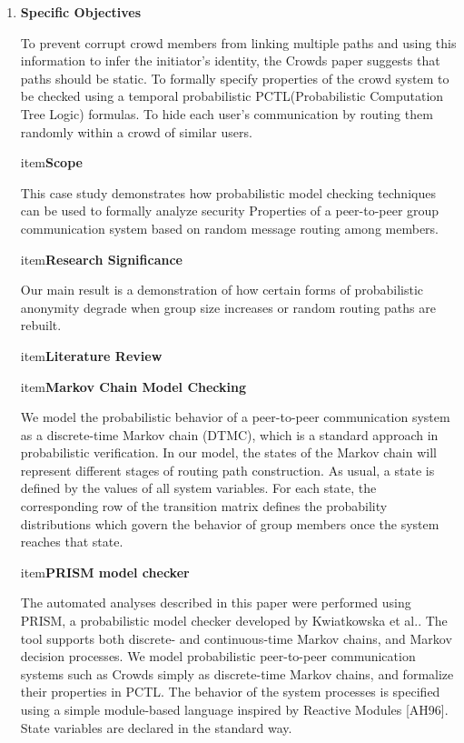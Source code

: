 \documentclass[10pt]{article}
\begin{document}
\begin{enumerate}
	\item\textbf{{\large Specific Objectives}}
	{\raggedright
	{\large To prevent corrupt crowd members from linking multiple paths and using this information to infer the initiator’s identity, the Crowds paper suggests that paths should be static.
To formally specify properties of the crowd system to be checked using a temporal probabilistic PCTL(Probabilistic Computation Tree Logic) formulas.
To hide each user’s communication by routing them randomly within a crowd of similar users.}
}
\begin{enumerate}
	item\textbf{{\large Scope}}
\end {enumerate}
	{\raggedright
{\large This case study demonstrates how probabilistic model checking techniques can be used to formally analyze security
Properties of a peer-to-peer group communication system based on random message routing among members.
 }
}
\begin{enumerate}
	item\textbf{{\large Research Significance}}
	\end {enumerate}
		{\raggedright
	{\large Our main result is a demonstration of how certain forms of probabilistic anonymity degrade when group size increases or random routing paths are rebuilt.}
}
\begin{enumarate}
item\textbf{{\large Literature Review}}
\end{enumarate}
\begin{enumarate}
item\textbf{{\large Markov Chain Model Checking}}
\end{enumarate}
{\raggedright
{\large We model the probabilistic behavior of a peer-to-peer communication system as a discrete-time Markov chain (DTMC), which is a standard approach in probabilistic verification. In our model, the states of the Markov chain will represent different stages of routing path construction. As usual, a state is defined by the values of all system variables. For each state, the corresponding row of the transition matrix defines the probability distributions which govern the behavior of group members once the system reaches that state.}
\begin{enumarate}
item\textbf{{\large PRISM model checker}}
\end{enumarate}
{\raggedright
{\large The automated analyses described in this paper were performed using PRISM, a
probabilistic model checker developed by Kwiatkowska et al.. The tool supports both discrete- and continuous-time Markov chains, and Markov decision processes. We model probabilistic peer-to-peer communication systems such as Crowds simply as discrete-time Markov chains, and formalize their properties in PCTL. The behavior of the system processes is specified using a simple module-based language inspired by Reactive Modules [AH96]. State variables are declared in the standard way. 
}}}
\end{enumerate}
\end{document}
